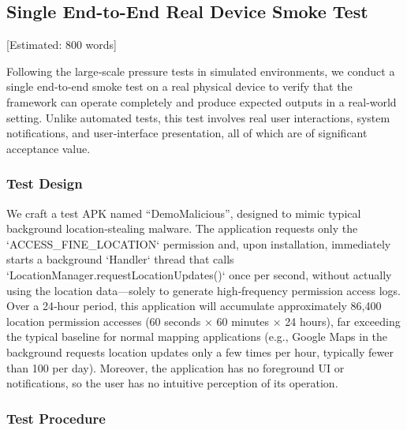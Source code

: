 \subsection{Single End-to-End Real Device Smoke Test} [Estimated: 800 words]

Following the large‑scale pressure tests in simulated environments, we conduct a single end‑to‑end smoke test on a real physical device to verify that the framework can operate completely and produce expected outputs in a real‑world setting. Unlike automated tests, this test involves real user interactions, system notifications, and user‑interface presentation, all of which are of significant acceptance value.

\subsubsection{Test Design}

We craft a test APK named “DemoMalicious”, designed to mimic typical background location‑stealing malware. The application requests only the `ACCESS\_FINE\_LOCATION` permission and, upon installation, immediately starts a background `Handler` thread that calls `LocationManager.requestLocationUpdates()` once per second, without actually using the location data—solely to generate high‑frequency permission access logs. Over a 24‑hour period, this application will accumulate approximately 86,400 location permission accesses (60 seconds × 60 minutes × 24 hours), far exceeding the typical baseline for normal mapping applications (e.g., Google Maps in the background requests location updates only a few times per hour, typically fewer than 100 per day). Moreover, the application has no foreground UI or notifications, so the user has no intuitive perception of its operation.

\subsubsection{Test Procedure}

